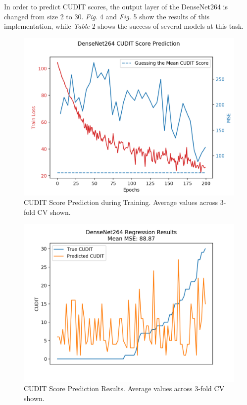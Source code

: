 \documentclass[conference]{IEEEtran}
\begin{document}
In order to predict CUDIT scores, the output layer of the DenseNet264 is changed from size 2 to 30. \textit{Fig.} 4 and \textit{Fig.} 5 show the results of this implementation, while \textit{Table} 2 shows the success of several models at this task. 

\begin{figure}[h]
\centerline{\includegraphics[scale = 0.45]{DenseNet264_CuditScorePrediction_TrainLoss.png}}
\caption{CUDIT Score Prediction during Training. Average values across 3-fold CV shown. }
\label{Picture1}
\end{figure}

\begin{figure}[h]
\centerline{\includegraphics[scale = 0.45]{DenseNet264_CuditScorePrediction_Visual.png}}
\caption{CUDIT Score Prediction Results. Average values across 3-fold CV shown.}
\label{Picture1}
\end{figure}
\end{document}
